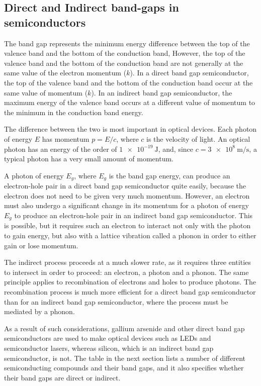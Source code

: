 \documentclass[%
 aip,
 amsmath,amssymb,
 reprint,%
]{revtex4-1}
\begin{document}
\subsection{Direct and Indirect band-gaps in semiconductors}
The band gap represents the minimum energy difference between the top of the valence band and
the bottom of the conduction band, However, the top of the valence band and the bottom of the
conduction band are not generally at the same value of the electron momentum ($k$). In a direct
band gap semiconductor, the top of the valence band and the bottom of the conduction band
occur at the same value of momentum ($k$). In an indirect band gap semiconductor, the maximum energy of the valence band occurs at a
different value of momentum to the minimum in the conduction band energy. 

\par
The difference between the two is most important in optical devices. Each photon of energy $E$
has momentum $p = E / c$, where $c$ is the velocity of light. An optical photon has an energy of the order of $\SI{1e-19}{\joule}$, and, since $c = \SI{3e8}{\metre \per \second}$, a typical photon has a very small amount of
momentum.

\par

A photon of energy $E_g$, where $E_g$ is the band gap energy, can produce an electron-hole pair in a
direct band gap semiconductor quite easily, because the electron does not need to be given very
much momentum. However, an electron must also undergo a significant change in its momentum
for a photon of energy $E_g$ to produce an electron-hole pair in an indirect band gap semiconductor.
This is possible, but it requires such an electron to interact not only with the photon to gain energy,
but also with a lattice vibration called a phonon in order to either gain or lose momentum.

\par
The indirect process proceeds at a much slower rate, as it requires three entities to intersect in order
to proceed: an electron, a photon and a phonon. The same principle applies to recombination of
electrons and holes to produce photons. The recombination process is much more efficient for a
direct band gap semiconductor than for an indirect band gap semiconductor, where the process
must be mediated by a phonon.

\par
As a result of such considerations, gallium arsenide and other direct band gap semiconductors are
used to make optical devices such as LEDs and semiconductor lasers, whereas silicon, which is an
indirect band gap semiconductor, is not. The table in the next section lists a number of different
semiconducting compounds and their band gaps, and it also specifies whether their band gaps are
direct or indirect.
\end{document}
